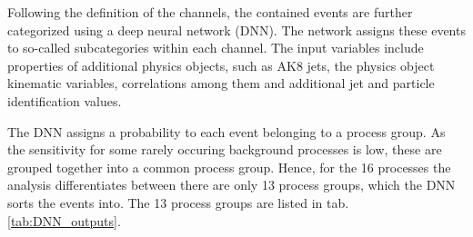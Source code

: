
Following the definition of the channels, the contained events are further categorized using a deep neural network (DNN). The network assigns these events to so-called subcategories within each channel. The input variables include properties of additional physics objects, such as AK8 jets, the physics object kinematic variables, correlations among them and additional jet and particle identification values. %

The DNN assigns a probability to each event belonging to a process group. As the sensitivity for some rarely occuring background processes is low, these are grouped together into a common process group. Hence, for the 16 processes the analysis differentiates between there are only 13 process groups, which the DNN sorts the events into. The 13 process groups are listed in tab. \ref{tab:DNN_outputs}.

